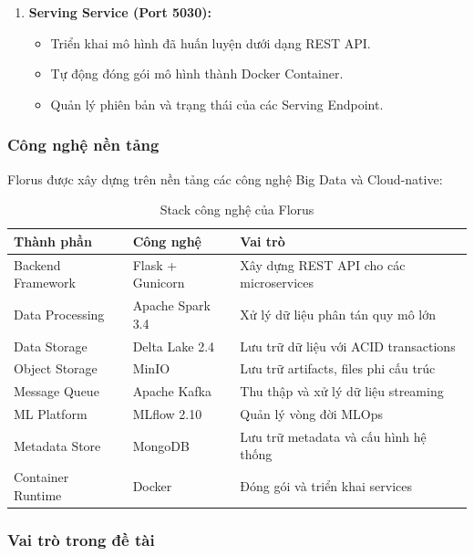 \begin{enumerate}
    \item \textbf{Serving Service (Port 5030):}
    \begin{itemize}
        \item Triển khai mô hình đã huấn luyện dưới dạng REST API.
        \item Tự động đóng gói mô hình thành Docker Container.
        \item Quản lý phiên bản và trạng thái của các Serving Endpoint.
    \end{itemize}
\end{enumerate}

\subsubsection{Công nghệ nền tảng}

Florus được xây dựng trên nền tảng các công nghệ Big Data và Cloud-native:

\begin{table}[H]
\centering
\caption{Stack công nghệ của Florus}
\label{tab:florus-tech-stack}
\begin{tabular}{|l|l|p{7cm}|}
\hline
\textbf{Thành phần} & \textbf{Công nghệ} & \textbf{Vai trò} \\
\hline
Backend Framework & Flask + Gunicorn & Xây dựng REST API cho các microservices \\
\hline
Data Processing & Apache Spark 3.4 & Xử lý dữ liệu phân tán quy mô lớn \\
\hline
Data Storage & Delta Lake 2.4 & Lưu trữ dữ liệu với ACID transactions \\
\hline
Object Storage & MinIO & Lưu trữ artifacts, files phi cấu trúc \\
\hline
Message Queue & Apache Kafka & Thu thập và xử lý dữ liệu streaming \\
\hline
ML Platform & MLflow 2.10 & Quản lý vòng đời MLOps \\
\hline
Metadata Store & MongoDB & Lưu trữ metadata và cấu hình hệ thống \\
\hline
Container Runtime & Docker & Đóng gói và triển khai services \\
\hline
\end{tabular}
\end{table}

\subsubsection{Vai trò trong đề tài}

